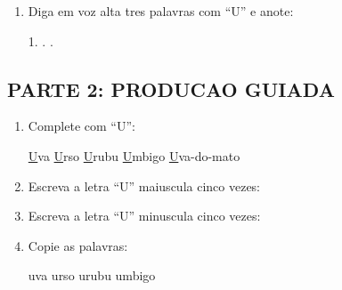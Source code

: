 \begin{exercicio}
\begin{enumerate}
  \item Diga em voz alta tres palavras com ``U'' e anote:
  \begin{center}
  1. \underline{\hspace{4cm}} . \underline{\hspace{4cm}} . \underline{\hspace{4cm}}
  \end{center}
\end{enumerate}

\subsection*{PARTE 2: PRODUCAO GUIADA}

\begin{enumerate}[resume]
  \item Complete com ``U'':
  \begin{center}
  \underline{U}va \quad \underline{U}rso \quad \underline{U}rubu \quad \underline{U}mbigo \quad \underline{U}va-do-mato
  \end{center}

  \item Escreva a letra ``U'' maiuscula cinco vezes:
  \begin{center}
  \underline{\hspace{1.5cm}} \quad \underline{\hspace{1.5cm}} \quad \underline{\hspace{1.5cm}} \quad \underline{\hspace{1.5cm}} \quad \underline{\hspace{1.5cm}}
  \end{center}

  \item Escreva a letra ``U'' minuscula cinco vezes:
  \begin{center}
  \underline{\hspace{1.5cm}} \quad \underline{\hspace{1.5cm}} \quad \underline{\hspace{1.5cm}} \quad \underline{\hspace{1.5cm}} \quad \underline{\hspace{1.5cm}}
  \end{center}

  \item Copie as palavras:
  \begin{center}
  uva \quad urso \quad urubu \quad umbigo
  \end{center}


\end{enumerate}
\end{exercicio}
